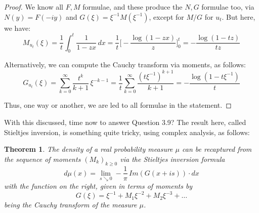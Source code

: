 \documentclass[12pt]{amsbook}
\newtheorem{theorem}{Theorem}[chapter]
\begin{document}
\begin{proof}
We know all $F,M$ formulae, and these produce the $N,G$ formulae too, via $N(y)=F(-iy)$ and $G(\xi)=\xi^{-1}M(\xi^{-1})$, except for $M/G$ for $u_t$. But here, we have:
$$M_{u_t}(\xi)=\frac{1}{t}\int_0^t\frac{1}{1-zx}\,dx=\frac{1}{t}\Big[-\frac{\log(1-zx)}{z}\Big]_0^t=-\frac{\log(1-tz)}{tz}$$

Alternatively, we can compute the Cauchy transform via moments, as follows:
$$G_{u_t}(\xi)=\sum_{k=0}^\infty\frac{t^k}{k+1}\,\xi^{-k-1}=\frac{1}{t}\sum_{k=0}^\infty\frac{(t\xi^{-1})^{k+1}}{k+1}=-\frac{\log(1-t\xi^{-1})}{t}$$

Thus, one way or another, we are led to all formulae in the statement.
\end{proof}

With this discussed, time now to answer Question 3.9? The result here, called Stieltjes inversion, is something quite tricky, using complex analysis, as follows:


\begin{theorem}
The density of a real probability measure $\mu$ can be recaptured from the sequence of moments $(M_k)_{k\geq0}$ via the Stieltjes inversion formula
$$d\mu (x)=\lim_{s\searrow 0}-\frac{1}{\pi}\,Im\left(G(x+is)\right)\cdot dx$$
with the function on the right, given in terms of moments by
$$G(\xi)=\xi^{-1}+M_1\xi^{-2}+M_2\xi^{-3}+\ldots$$
being the Cauchy transform of the measure $\mu$.
\end{theorem}
\end{document}
